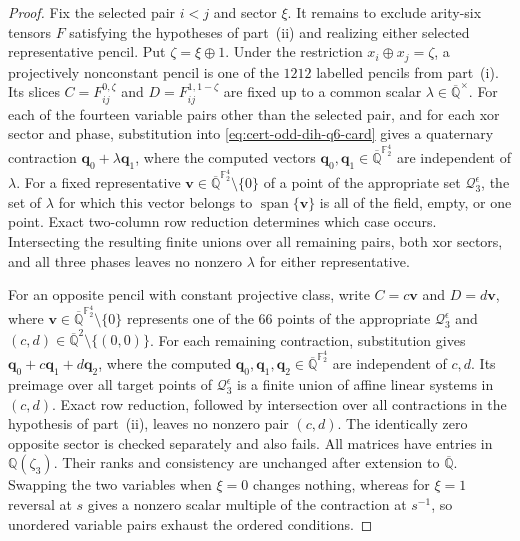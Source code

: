 \documentclass[11pt,letterpaper,onecolumn]{article}
\theoremstyle{plain}
\theoremstyle{definition}
\theoremstyle{remark}
\newcommand{\AlgNums}{\overline{\mathbb Q}}
\newcommand{\Ftwo}{\mathbb F_2}
\newcommand{\Span}{\operatorname{span}}
\begin{document}
\begin{proof}
		Fix the selected pair \(i<j\) and sector \(\xi\).  It remains to exclude
		arity-six tensors \(F\) satisfying the hypotheses of part~\textnormal{(ii)}
		and realizing either selected representative pencil.  Put
		\(\zeta=\xi\oplus1\).  Under the restriction \(x_i\oplus x_j=\zeta\),
		a projectively nonconstant pencil is one
		of the \(1212\) labelled pencils from
		part~\textnormal{(i)}.
		Its slices \(C=F_{ij}^{0,\zeta}\) and \(D=F_{ij}^{1,1-\zeta}\) are fixed
		up to a common scalar \(\lambda\in\AlgNums^\times\).  For each of the
		fourteen variable pairs other than the selected pair, and for each xor sector and
		phase, substitution into \cref{eq:cert-odd-dih-q6-card} gives a quaternary
		contraction \({\mathbf q}_0+\lambda {\mathbf q}_1\), where the computed vectors
		\({\mathbf q}_0,{\mathbf q}_1\in\AlgNums^{\Ftwo^4}\) are independent of \(\lambda\).  For a
		fixed representative \({\mathbf v}\in\AlgNums^{\Ftwo^4}\setminus\{0\}\) of a point
		of the appropriate set \(\mathcal Q_3^\epsilon\), the set of \(\lambda\)
		for which this vector belongs to
		\(\Span\{{\mathbf v}\}\) is all of the field, empty, or one
		point. Exact two-column row reduction determines which case occurs.
		Intersecting the resulting finite unions over all remaining pairs, both xor
		sectors, and all three phases leaves no nonzero \(\lambda\) for either
		representative.
		
		For an opposite pencil with constant projective class, write \(C=c{\mathbf v}\) and
		\(D=d{\mathbf v}\), where \({\mathbf v}\in\AlgNums^{\Ftwo^4}\setminus\{0\}\) represents one
		of the \(66\) points of the appropriate \(\mathcal Q_3^\epsilon\) and \((c,d)\in\AlgNums^2\setminus\{(0,0)\}\).
		For each remaining contraction, substitution gives
		\({\mathbf q}_0+c{\mathbf q}_1+d{\mathbf q}_2\), where the computed
		\({\mathbf q}_0,{\mathbf q}_1,{\mathbf q}_2\in\AlgNums^{\Ftwo^4}\) are independent of \(c,d\).  Its
		preimage over all target points of \(\mathcal Q_3^\epsilon\) is a finite union of affine linear
		systems in \((c,d)\).  Exact row reduction,
		followed by intersection over all contractions in the hypothesis of
		part~\textnormal{(ii)}, leaves no
		nonzero pair \((c,d)\).  The identically zero opposite sector is checked
		separately and also fails.  All matrices have entries in
		\(\mathbb Q(\zeta_3)\). Their ranks and consistency are unchanged after
		extension to \(\AlgNums\).  Swapping the two variables when \(\xi=0\) changes nothing, whereas for
		\(\xi=1\) reversal at \(s\) gives a nonzero scalar multiple of the contraction
		at \(s^{-1}\), so unordered variable pairs exhaust the ordered conditions.
		

\end{proof}
\end{document}
